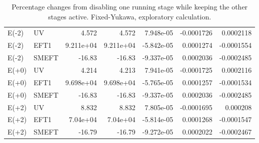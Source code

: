 \begin{table}[htbp]
\begin{tabular}{llrrrrr}
E(-2) & UV & 4.572 & 4.572 & 7.948e-05 & -0.0001726 & 0.0002118 \\
E(-2) & EFT1 & 9.211e+04 & 9.211e+04 & -5.842e-05 & 0.0001274 & -0.0001554 \\
E(-2) & SMEFT & -16.83 & -16.83 & -9.337e-05 & 0.0002036 & -0.0002485 \\
E(+0) & UV & 4.214 & 4.213 & 7.941e-05 & -0.0001725 & 0.0002116 \\
E(+0) & EFT1 & 9.698e+04 & 9.698e+04 & -5.765e-05 & 0.0001257 & -0.0001534 \\
E(+0) & SMEFT & -16.83 & -16.83 & -9.337e-05 & 0.0002036 & -0.0002485 \\
E(+2) & UV & 8.832 & 8.832 & 7.805e-05 & -0.0001695 & 0.000208 \\
E(+2) & EFT1 & 7.04e+04 & 7.04e+04 & -5.814e-05 & 0.0001268 & -0.0001547 \\
E(+2) & SMEFT & -16.79 & -16.79 & -9.272e-05 & 0.0002022 & -0.0002467 \\
\hline
\end{tabular}
\caption{Percentage changes from disabling one running stage while keeping the other stages active. Fixed-Yukawa, exploratory calculation.}
\label{tab:generalised_running_a-4}
\end{table}

